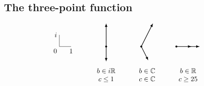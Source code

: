 \documentclass[12pt,a4paper,notitlepage]{report}
\numberwithin{equation}{section}
\theoremstyle{break}
\begin{document}
\subsection{The three-point function \label{sectpf}}

\begin{equation}
 \begin{tikzpicture}[baseline=(current  bounding  box.center), scale = .6]
\draw (0, 2) node[left]{$i$} -- (0, 1) node[below left] {$0$} -- (1, 1) node[below] {$1$};
\draw [thick, latex-latex] (4,3) -- (4,1) node[fill, circle, minimum size = 1mm, inner sep = 0]{} -- (4,-.3);
\draw [thick, latex-latex] (8,3) -- (7,1) node[fill, circle, minimum size = 1mm, inner sep = 0]{}-- (7.6,-.2);
\draw [thick, latex-latex] (12,1) -- (10,1) node[fill, circle, minimum size = 1mm, inner sep = 0]{} -- (11.3,1) ;
\node at (4, -1.5){$\begin{array}{c} b\in i\mathbb{R} \\ c\leq 1 \end{array}$};
\node at (7.5, -1.5){$\begin{array}{c} b\in \mathbb{C} \\ c\in\mathbb{C} \end{array}$};
\node at (11, -1.5){$\begin{array}{c} b\in \mathbb{R} \\ c\geq 25 \end{array}$};
 \end{tikzpicture}
\end{equation}
\end{document}
